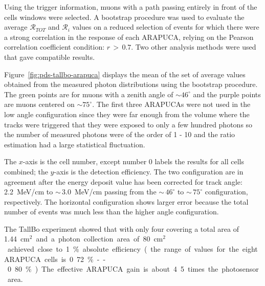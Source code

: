 Using the trigger information, muons with a path passing entirely in front of the  cells windows were selected.
A bootstrap procedure \cite{stats-diaconis-efron-1983} was used to evaluate the average $\mathcal{R}_{TOT} $ and $\mathcal{R}_{i}$ values on a reduced selection of events for which there were a strong correlation in the response of each ARAPUCA, relying on the Pearson correlation coefficient condition: $r\,>\,0.7$. Two other analysis methods were used that gave compatible results. 


Figure~\ref{fig:pds-tallbo-arapuca} displays the mean of the set of average values obtained from the measured photon distributions using the bootstrap procedure.
The green points are for muons with a zenith angle of $\sim 46^{\circ}$ and the purple points are muons centered on $\sim 75^{\circ}$.
The first three ARAPUCAs were not used in the low angle configuration since they were far enough from the volume where the tracks were triggered that they were exposed to only a few hundred photons so the number of measured photons were of the order of 1 - 10 and the ratio estimation had a large statistical fluctuation. 
 
The $x$-axis is the  cell number, except number 0 labels the results for all cells combined; the $y$-axis is the detection efficiency. The two configuration are in agreement after the energy deposit value has been corrected for track angle: \SI{2.2}{MeV/cm} to
 $\sim\,$\SI{3.0}{ MeV/cm} passing from the $\sim\,46^{\circ}$ to $\sim\,75^{\circ}$ configuration, respectively.
The horizontal configuration shows larger error because the total number of events was much less than the higher angle configuration.

The TallBo experiment showed that  with only four  %
covering a total area of \SI{1.44}{cm$^2$} and a photon collection area of \SI{80}{cm$^2$} achieved close to 1\% absolute efficiency (the range of values for the eight ARAPUCA cells is 0.72\%--0.80\%). The effective ARAPUCA gain is about 4.5 times the photosensor area.

